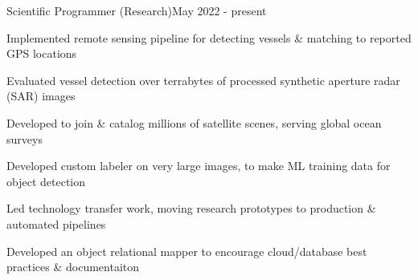 \documentclass{article}
\newenvironment{**mylist}[2]{

\subsubsection*{#1\hfill#2}
  \small
  \begin{list}{}{}
    \setlength{\topsep}{0pt}
   \setlength{\itemsep}{1pt}
   \setlength{\parskip}{0pt}
   \setlength{\parsep}{0pt}}{\end{list}\normalsize}
\begin{document}
\BSec{}%
\begin{**mylist}{\href{https://globalfishingwatch.org/}{} \tabb Scientific Programmer (Research)}{May 2022 - present}
\item Implemented remote sensing pipeline for detecting vessels \& matching to reported GPS locations
\item Evaluated vessel detection over terrabytes of processed synthetic aperture radar (SAR) images 
\item Developed  to join \& catalog millions of satellite scenes, serving global ocean surveys
\item Developed custom labeler on very large images, to make ML training data for object detection
\item Led technology transfer work, moving research prototypes to production \& automated pipelines
\item Developed an object relational mapper to encourage cloud/database best practices \& documentaiton
\end{**mylist}
\end{document}
